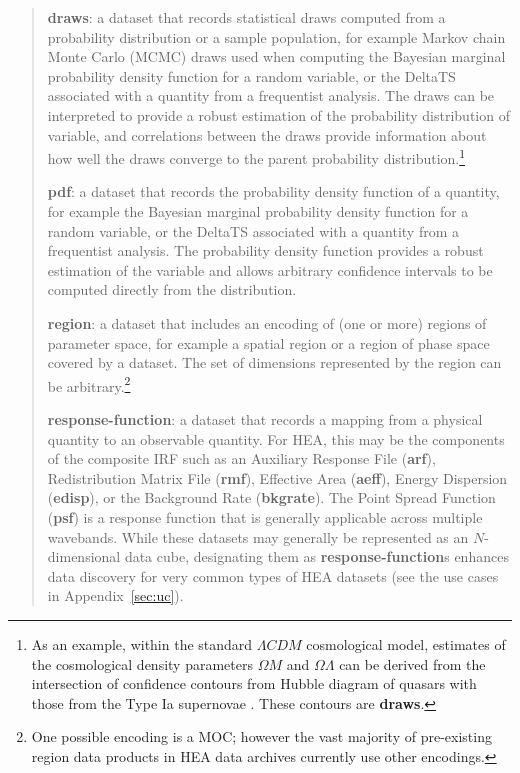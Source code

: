 \documentclass[11pt,a4paper]{ivoa}
\begin{document}
\begin{quote}
{\bf draws}: a dataset that records statistical draws computed from a probability distribution or a sample population, for example Markov chain Monte Carlo (MCMC) draws used when computing the Bayesian marginal probability density function for a random variable, or the DeltaTS associated with a quantity from a frequentist analysis. The draws can be interpreted to provide a robust estimation of the probability distribution of variable, and correlations between the draws provide information about how well the draws converge to the parent probability distribution.\footnote{As an example, within the standard $\Lambda CDM$ cosmological model, estimates of the cosmological density parameters $\Omega M$ and $\Omega\Lambda$ can be derived from the intersection of confidence contours from Hubble diagram of quasars with those from the Type Ia supernovae \citep{2019adds.book..283C}.  These contours are {\bf draws}.}

{\bf pdf}: a dataset that records the probability density function of a quantity, for example the Bayesian marginal probability density function for a random variable, or the DeltaTS associated with a quantity from a frequentist analysis. The probability density function provides a robust estimation of the variable and allows arbitrary confidence intervals to be computed directly from the distribution.

{\bf region}: a dataset that includes an encoding of (one or more) regions of parameter space, for example a spatial region or a region of phase space covered by a dataset. The set of dimensions represented by the region can be arbitrary.\footnote{One possible encoding is a \gls{MOC}; however the vast majority of pre-existing region data products in \gls{HEA} data archives currently use other encodings.}

{\bf response-function}: a dataset that records a mapping from a physical quantity to an observable quantity. For \gls{HEA}, this may be the components of the composite \gls{IRF} such as an Auxiliary Response File ({\bf arf}), Redistribution Matrix File ({\bf rmf}), Effective Area ({\bf aeff}), Energy Dispersion ({\bf edisp}), or the Background Rate ({\bf bkgrate}). The Point Spread Function ({\bf psf}) is a response function that is generally applicable across multiple wavebands. While these datasets may generally be represented as an $N$-dimensional data cube, designating them as {\bf response-function}s enhances data discovery for very common types of \gls{HEA} datasets (see the use cases in Appendix~\ref{sec:uc}).
\end{quote}
\end{document}
